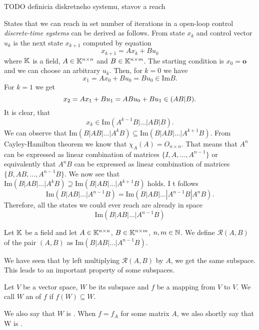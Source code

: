 TODO definicia diskretneho systemu, stavov a reach

\begin{definition}
	
\end{definition}

States that we can reach in set number of iterations in a open-loop control \textit{discrete-time systems} can be derived as follows. From state $x_k$ and control vector $u_k$ is the next state $x_{k+1}$ computed by equation $$x_{k+1}=Ax_k+Bu_k$$ where $\mathbb{K}$ is a field, $A\in\mathbb{K}^{n\times n}$ and $B\in\mathbb{K}^{n\times m}$. The starting condition is $x_0=\textbf{o}$ and we can choose an arbitrary $u_k$. Then, for $k=0$ we have $$x_1=Ax_0+Bu_0=Bu_0 \in \text{Im}B.$$ For $k=1$ we get $$x_2=Ax_1+Bu_1=ABu_0+Bu_1\in\text(AB|B).$$ It is clear, that $$x_k\in\text{Im}(A^{k-1}B|\ldots|AB|B).$$ We can observe that $\text{Im}(B|AB|\ldots|A^kB) \subseteq \text{Im}(B|AB|\ldots|A^{k+1}B)$. From Cayley-Hamilton theorem we know that $\chi_A(A)=O_{n\times n}$. That means that $A^n$ can be expressed as linear combination of matrices $\{I,A,\ldots,A^{n-1}\}$ or equivalently that $A^nB$ can be expressed as linear combination of matrices $\{B,AB,\ldots,A^{n-1}B\}$. We now see that $\text{Im}(B|AB|\ldots|A^kB) \supseteq \text{Im}(B|AB|\ldots|A^{k+1}B)$ holds. I t follows $$\text{Im}(B|AB|\ldots|A^{n-1}B)=\text{Im}(B|AB|\ldots|A^{n-1}B|A^nB).$$ Therefore, all the states we could ever reach are already in space $$\text{Im}(B|AB|\ldots|A^{n-1}B)$$

\begin{definition}
	Let $\mathbb{K}$ be a field and let $A \in \mathbb{K}^{n \times n}$, $B \in \mathbb{K}^{n \times m}$, $n,m \in \mathbb{N}$. We define  $\mathcal{R}(A,B)$ of the pair $(A,B)$ as $\text{Im}(B|AB|\ldots|A^{n-1}B)$.
\end{definition}

We have seen that by left multiplying $\mathcal{R}(A,B)$ by $A$, we get the same subspace. This leads to an important property of some subspaces.

\begin{definition}
	Let $V$ be a vector space, $W$ be its subspace and $f$ be a mapping from $V$ to $V$. We call $W$ an  of $f$ if $f(W)\subseteq W$.

	We also say that $W$ is . When $f=f_A$ for some matrix $A$, we also shortly say that W is .
\end{definition}

